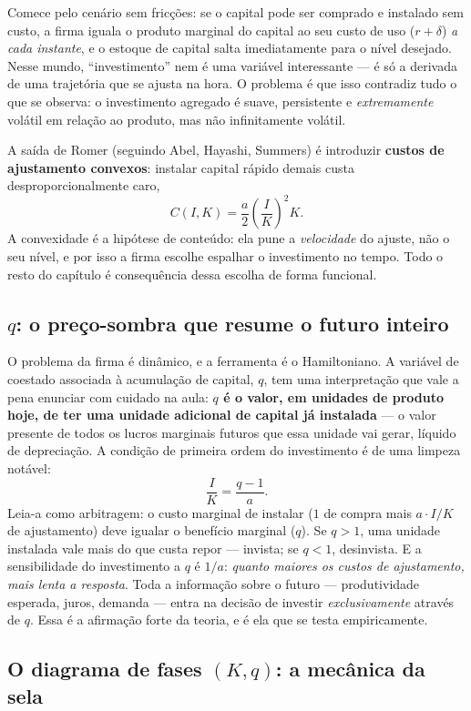 \documentclass[11pt,a4paper]{article}
\newcommand{\ideia}[1]{\textcolor{destaque}{\textbf{#1}}}
\begin{document}
Comece pelo cenário sem fricções: se o capital pode ser comprado e
instalado sem custo, a firma iguala o produto marginal do capital ao seu
custo de uso ($r+\delta$) \emph{a cada instante}, e o estoque de capital
salta imediatamente para o nível desejado. Nesse mundo, ``investimento''
nem é uma variável interessante --- é só a derivada de uma trajetória
que se ajusta na hora. O problema é que isso contradiz tudo o que se
observa: o investimento agregado é suave, persistente e
\emph{extremamente} volátil em relação ao produto, mas não infinitamente
volátil.

A saída de Romer (seguindo Abel, Hayashi, Summers) é introduzir
\ideia{custos de ajustamento convexos}: instalar capital rápido demais
custa desproporcionalmente caro,
\[
  C(I,K) = \frac{a}{2}\left(\frac{I}{K}\right)^2 K.
\]
A convexidade é a hipótese de conteúdo: ela pune a \emph{velocidade} do
ajuste, não o seu nível, e por isso a firma escolhe espalhar o
investimento no tempo. Todo o resto do capítulo é consequência dessa
escolha de forma funcional.

\subsection{$q$: o preço-sombra que resume o futuro inteiro}

O problema da firma é dinâmico, e a ferramenta é o Hamiltoniano. A
variável de coestado associada à acumulação de capital, $q$, tem uma
interpretação que vale a pena enunciar com cuidado na aula: \ideia{$q$ é
o valor, em unidades de produto hoje, de ter uma unidade adicional de
capital já instalada} --- o valor presente de todos os lucros marginais
futuros que essa unidade vai gerar, líquido de depreciação. A condição
de primeira ordem do investimento é de uma limpeza notável:
\[
  \frac{I}{K} = \frac{q-1}{a}.
\]
Leia-a como arbitragem: o custo marginal de instalar ($1$ de compra mais
$a \cdot I/K$ de ajustamento) deve igualar o benefício marginal ($q$).
Se $q>1$, uma unidade instalada vale mais do que custa repor --- invista;
se $q<1$, desinvista. E a sensibilidade do investimento a $q$ é $1/a$:
\emph{quanto maiores os custos de ajustamento, mais lenta a resposta}.
Toda a informação sobre o futuro --- produtividade esperada, juros,
demanda --- entra na decisão de investir \emph{exclusivamente} através
de $q$. Essa é a afirmação forte da teoria, e é ela que se testa
empiricamente.

\subsection{O diagrama de fases $(K,q)$: a mecânica da sela}
\end{document}
